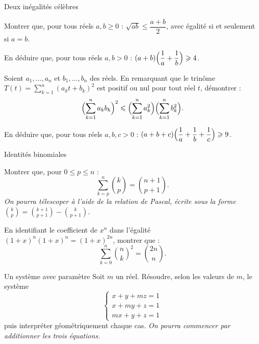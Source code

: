 
\begin{exercice}[3]{Deux inégalités célèbres}
\begin{questions}
  \item {} Montrer que, pour tous réels $a,b\geq0$ :
    $\sqrt{ab}\leq\dfrac{a+b}{2}$, avec égalité si et seulement si $a=b$.
  \item En déduire que, pour tous réels $a,b>0$ :
    $(a+b)\Bigl(\dfrac1a+\dfrac1b\Bigr)\geq4$.
  \item {} Soient $a_1,\dots,a_n$ et $b_1,\dots,b_n$ des réels.
    En remarquant que le trinôme
    $T(t)=\displaystyle\sum_{k=1}^{n}(a_k t+b_k)^{2}$
    est positif ou nul pour tout réel $t$, démontrer :
    \[
      \Bigl(\sum_{k=1}^{n}a_k b_k\Bigr)^{2}\leq
      \Bigl(\sum_{k=1}^{n}a_k^{2}\Bigr)\Bigl(\sum_{k=1}^{n}b_k^{2}\Bigr).
    \]
  \item En déduire que, pour tous réels $a,b,c>0$ :
    $(a+b+c)\Bigl(\dfrac1a+\dfrac1b+\dfrac1c\Bigr)\geq9$.
\end{questions}
\end{exercice}

\begin{exercice}[3]{Identités binomiales}
\begin{questions}
  \item {} Montrer que, pour $0\leq p\leq n$ :
    \[
      \sum_{k=p}^{n}\binom{k}{p}=\binom{n+1}{p+1}.
    \]
    \emph{On pourra télescoper à l'aide de la relation de Pascal, écrite sous la forme
    $\binom{k}{p}=\binom{k+1}{p+1}-\binom{k}{p+1}$.}
  \item {} En identifiant le coefficient de $x^{n}$
    dans l'égalité $(1+x)^{n}(1+x)^{n}=(1+x)^{2n}$, montrer que :
    \[
      \sum_{k=0}^{n}\binom{n}{k}^{2}=\binom{2n}{n}.
    \]
\end{questions}
\end{exercice}

\begin{exercice}[3]{Un système avec paramètre}
Soit $m$ un réel. Résoudre, selon les valeurs de $m$, le système
\[
  \begin{cases} x+y+mz=1\\ x+my+z=1\\ mx+y+z=1 \end{cases}
\]
puis interpréter géométriquement chaque cas.
\emph{On pourra commencer par additionner les trois équations.}
\end{exercice}

